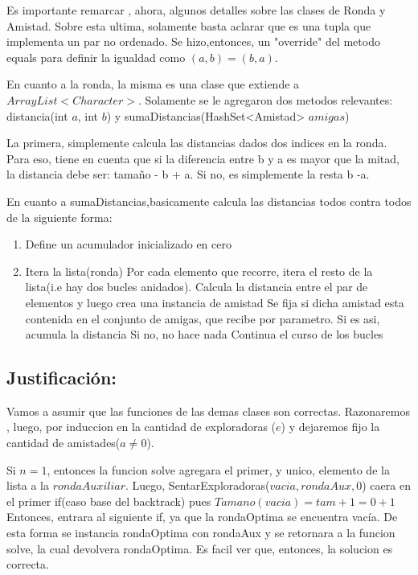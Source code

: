 \documentclass[10pt, a4paper]{article}
\begin{document}
Es importante remarcar , ahora, algunos detalles sobre las clases de Ronda y Amistad.
Sobre esta ultima, solamente basta aclarar que es una tupla que implementa un par no ordenado. Se hizo,entonces, un "override" del metodo equals para definir la igualdad como $(a,b) = (b,a).$

En cuanto a la ronda, la misma es una clase que extiende a $ArrayList<Character>$. Solamente se le agregaron dos metodos relevantes:
distancia(int $a$, int $b$) y sumaDistancias(HashSet<Amistad> $amigas$)

La primera, simplemente calcula las distancias dados dos indices en la ronda. Para eso, tiene en cuenta que si la diferencia entre b y a es mayor que la mitad, la distancia debe ser: tamaño - b + a. Si no, es simplemente la resta b -a.

En cuanto a sumaDistancias,basicamente calcula las distancias todos contra todos de la siguiente forma:

\begin{enumerate}
 \item Define un acumulador inicializado en cero
\item Itera la lista(ronda)
	\subitem Por cada elemento que recorre, itera el resto de la lista(i.e hay dos bucles anidados).
	\subitem Calcula la distancia entre el par de elementos y luego crea una instancia de amistad
	\subitem Se fija si dicha amistad esta contenida en el conjunto de amigas, que recibe por parametro.
		\subitem \hspace{6mm} Si es asi, acumula la distancia
		\subitem \hspace{6mm} Si no, no hace nada
	\subitem Continua el curso de los bucles
\end{enumerate}


\subsection{Justificación:}

Vamos a asumir que las funciones de las demas clases son correctas. Razonaremos , luego, por induccion en la cantidad de exploradoras ($e$) y dejaremos fijo la cantidad de amistades($a \neq 0$).

Si $n = 1$, entonces la funcion solve agregara el primer, y unico, elemento de la lista a la $rondaAuxiliar$. Luego, SentarExploradoras($vacia,rondaAux,0$) caera en el primer if(caso base del backtrack) pues $Tamano(vacia) = tam+1 = 0 +1$
Entonces, entrara al siguiente if, ya que la rondaOptima se encuentra vacía. De esta forma se instancia rondaOptima con rondaAux y se retornara a la funcion solve, la cual devolvera rondaOptima. Es facil ver que, entonces, la solucion es correcta.
\end{document}

